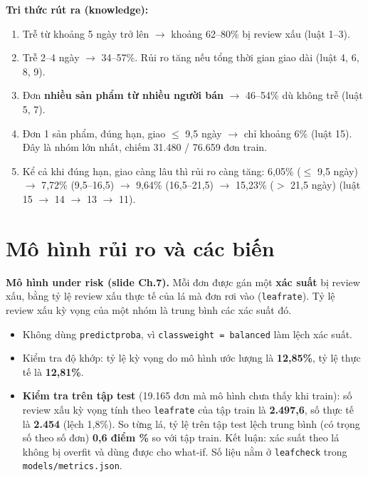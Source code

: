 \documentclass[12pt,a4paper]{report}
\newcommand{\code}[1]{\texttt{#1}}
\renewcommand{\_}{\oldunderscore\allowbreak}
\begin{document}
\textbf{Tri thức rút ra (knowledge):}
\begin{enumerate}
\item Trễ từ khoảng 5 ngày trở lên $\rightarrow$ khoảng 62--80\% bị review xấu (luật 1--3).
\item Trễ 2--4 ngày $\rightarrow$ 34--57\%. Rủi ro tăng nếu tổng thời gian giao dài (luật 4, 6, 8, 9).
\item Đơn \textbf{nhiều sản phẩm từ nhiều người bán} $\rightarrow$ 46--54\% dù không trễ (luật 5, 7).
\item Đơn 1 sản phẩm, đúng hạn, giao $\le$ 9,5 ngày $\rightarrow$ chỉ khoảng 6\% (luật 15). Đây là nhóm lớn nhất, chiếm 31.480 / 76.659 đơn train.
\item Kể cả khi đúng hạn, giao càng lâu thì rủi ro càng tăng: 6,05\% ($\le$ 9,5 ngày) $\rightarrow$ 7,72\% (9,5--16,5) $\rightarrow$ 9,64\% (16,5--21,5) $\rightarrow$ 15,23\% ($>$ 21,5 ngày) (luật 15 $\rightarrow$ 14 $\rightarrow$ 13 $\rightarrow$ 11).
\end{enumerate}

\section{Mô hình rủi ro và các biến}\label{sec:risk}

\textbf{Mô hình under risk (slide Ch.7).} Mỗi đơn được gán một \textbf{xác suất} bị review xấu, bằng tỷ lệ review xấu thực tế của lá mà đơn rơi vào (\code{leaf\_rate}). Tỷ lệ review xấu kỳ vọng của một nhóm là trung bình các xác suất đó.
\begin{itemize}
\item Không dùng \code{predict\_proba}, vì \code{class\_weight = balanced} làm lệch xác suất.
\item Kiểm tra độ khớp: tỷ lệ kỳ vọng do mô hình ước lượng là \textbf{12,85\%}, tỷ lệ thực tế là \textbf{12,81\%}.
\item \textbf{Kiểm tra trên tập test} (19.165 đơn mà mô hình chưa thấy khi train): số review xấu kỳ vọng tính theo \code{leaf\_rate} của tập train là \textbf{2.497,6}, số thực tế là \textbf{2.454} (lệch 1,8\%). So từng lá, tỷ lệ trên tập test lệch trung bình (có trọng số theo số đơn) \textbf{0,6 điểm \%} so với tập train. Kết luận: xác suất theo lá không bị overfit và dùng được cho what-if. Số liệu nằm ở \code{leaf\_check} trong \code{models/metrics.json}.
\end{itemize}
\end{document}
